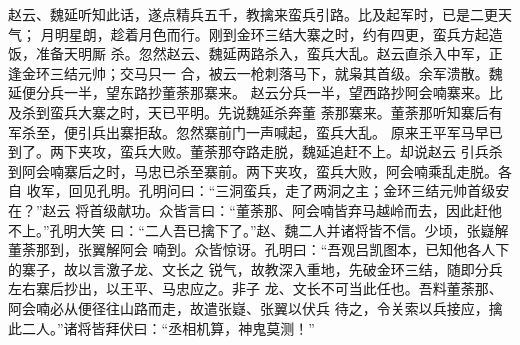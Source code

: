 赵云、魏延听知此话，遂点精兵五千，教擒来蛮兵引路。比及起军时，已是二更天气；
月明星朗，趁着月色而行。刚到金环三结大寨之时，约有四更，蛮兵方起造饭，准备天明厮
杀。忽然赵云、魏延两路杀入，蛮兵大乱。赵云直杀入中军，正逢金环三结元帅；交马只一
合，被云一枪刺落马下，就枭其首级。余军溃散。魏延便分兵一半，望东路抄董荼那寨来。
赵云分兵一半，望西路抄阿会喃寨来。比及杀到蛮兵大寨之时，天已平明。先说魏延杀奔董
荼那寨来。董荼那听知寨后有军杀至，便引兵出寨拒敌。忽然寨前门一声喊起，蛮兵大乱。
原来王平军马早已到了。两下夹攻，蛮兵大败。董荼那夺路走脱，魏延追赶不上。却说赵云
引兵杀到阿会喃寨后之时，马忠已杀至寨前。两下夹攻，蛮兵大败，阿会喃乘乱走脱。各自
收军，回见孔明。孔明问曰：“三洞蛮兵，走了两洞之主；金环三结元帅首级安在？”赵云
将首级献功。众皆言曰：“董荼那、阿会喃皆弃马越岭而去，因此赶他不上。”孔明大笑
曰：“二人吾已擒下了。”赵、魏二人并诸将皆不信。少顷，张嶷解董荼那到，张翼解阿会
喃到。众皆惊讶。孔明曰：“吾观吕凯图本，已知他各人下的寨子，故以言激子龙、文长之
锐气，故教深入重地，先破金环三结，随即分兵左右寨后抄出，以王平、马忠应之。非子
龙、文长不可当此任也。吾料董荼那、阿会喃必从便径往山路而走，故遣张嶷、张翼以伏兵
待之，令关索以兵接应，擒此二人。”诸将皆拜伏曰：“丞相机算，神鬼莫测！”

